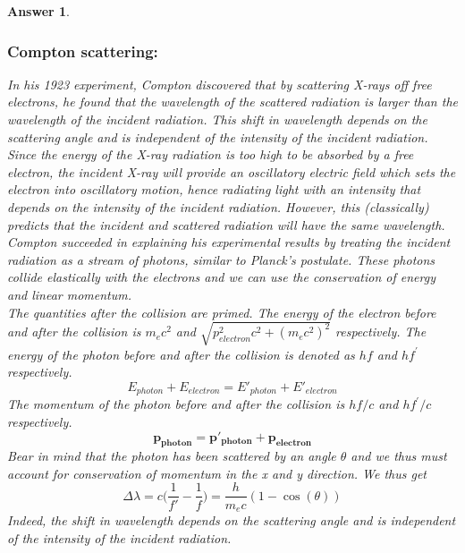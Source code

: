 \documentclass[a4paper]{article}
\newtheorem{ans}{Answer}[subsection]
\theoremstyle{new}
\begin{document}
\begin{ans}
\subsubsection*{Compton scattering:}
In his 1923 experiment, Compton discovered that by scattering X-rays off free electrons, he found that the wavelength of the scattered radiation is larger than the wavelength of the incident radiation. This shift in wavelength depends on the scattering angle and is independent of the intensity of the incident radiation.\\[5pt]
Since the energy of the X-ray radiation is too high to be absorbed by a free electron, the incident X-ray will provide an oscillatory electric field which sets the electron into oscillatory motion, hence radiating light with an intensity that depends on the intensity of the incident radiation. However, this (classically) predicts that the incident and scattered radiation will have the same wavelength.\\[5pt]
Compton succeeded in explaining his experimental results by treating the incident radiation as a stream of photons, similar to Planck's postulate. These photons collide elastically with the electrons and we can use the conservation of energy and linear momentum.\\[5pt]
The quantities after the collision are primed. The energy of the electron before and after the collision is $m_ec^2$ and $\sqrt{p_{electron}^2c^2+(m_ec^2)^2}$ respectively. The energy of the photon before and after the collision is denoted as $hf$ and $hf^\prime$ respectively.
$$E_{photon}+E_{electron}=E'_{photon}+E'_{electron}$$
The momentum of the photon before and after the collision is $hf/c$ and $hf^\prime/c$ respectively.
$$\mathbf{p_{photon}=p'_{photon}+p_{electron}}$$
Bear in mind that the photon has been scattered by an angle $\theta$ and we thus must account for conservation of momentum in the x and y direction. We thus get
$$\Delta\lambda=c\bigg(\frac{1}{f'}-\frac{1}{f}\bigg)=\frac{h}{m_ec}(1-\cos(\theta))$$
Indeed, the shift in wavelength depends on the scattering angle and is independent of the intensity of the incident radiation.
\end{ans}
\newpage
\end{document}
